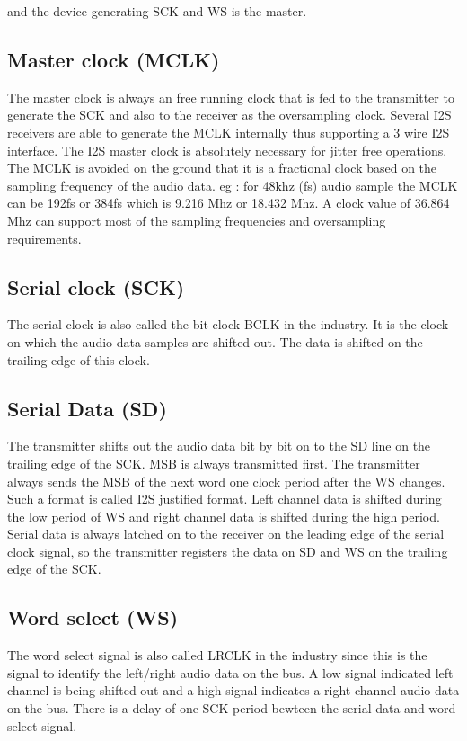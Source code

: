 \documentclass[12pt,a4paper]{report}
\begin{document}
and the device generating SCK and WS is the master.


\subsection{Master clock (MCLK)}
 The master clock is always an free running clock that is fed to the transmitter to generate the SCK and also to the receiver
as  the oversampling clock. Several I2S receivers are able to generate the MCLK internally thus supporting a 3 wire I2S interface. The I2S master clock is absolutely necessary for jitter free operations. The MCLK is avoided on the ground that it is a fractional clock based on the sampling frequency of the audio data. eg : for 48khz (fs) audio sample the MCLK can be 192fs or 384fs which is 9.216 Mhz or 18.432 Mhz. A clock value of 36.864 Mhz can support most of the sampling frequencies and oversampling requirements.
\subsection{Serial clock (SCK) }
The serial clock is also called the bit clock BCLK in the industry. It is the clock on which the audio data samples are shifted out. The data is shifted on the trailing edge of this clock.
\subsection{Serial Data (SD)}
 The transmitter shifts out the audio data bit by bit on to the SD line on the trailing edge of the SCK. MSB is always transmitted first. The transmitter
always sends the MSB of the next word one clock period after the
WS changes. Such a format is called I2S justified format. Left channel data is shifted during the low period of WS and right channel data is shifted during the high period.
Serial data is always latched on to the
receiver on the leading edge of the serial clock signal, so the transmitter registers the data on SD and WS on the trailing edge of the SCK.
\subsection{Word select (WS)}
The word select signal is also called LRCLK in the industry since this is the signal to identify the left/right audio data on the bus. A low signal indicated left channel is being shifted out and a high signal indicates a right channel audio data on the bus. There is a delay of one SCK period bewteen the serial data and word select signal.
\end{document}
